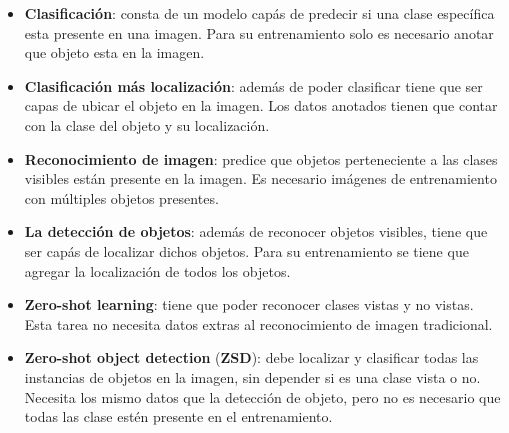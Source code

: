 \begin{itemize}
	\item \textbf{Clasificación}: consta de un modelo capás de predecir si una clase específica esta presente en una imagen. Para su entrenamiento solo es necesario anotar que objeto esta en la imagen.
	\item \textbf{Clasificación más localización}: además de poder clasificar tiene que ser capas de ubicar el objeto en la imagen. Los datos anotados tienen que contar con la clase del objeto y su localización.
	\item \textbf{Reconocimiento de imagen}: predice que objetos perteneciente a las clases visibles están presente en la imagen. Es necesario imágenes de entrenamiento con múltiples objetos presentes.
	\item \textbf{La detección de objetos}: además de reconocer objetos visibles, tiene que ser capás de localizar dichos objetos. Para su entrenamiento se tiene que agregar la localización de todos los objetos. 
	\item \textbf{Zero-shot learning}: tiene que poder reconocer clases vistas y no vistas. Esta tarea  no necesita datos extras al reconocimiento de imagen tradicional. 
	\item \textbf{Zero-shot object detection} (\textbf{ZSD}): debe localizar y clasificar todas las instancias de objetos en la imagen, sin depender si es una clase vista o no. Necesita los mismo datos que la detección de objeto, pero no es necesario que todas las clase estén presente en el entrenamiento.
\end{itemize}

